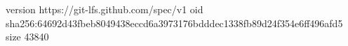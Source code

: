 version https://git-lfs.github.com/spec/v1
oid sha256:64692d43fbeb8049438eccd6a3973176bdddec1338fb89d24f354e6ff496afd5
size 43840
